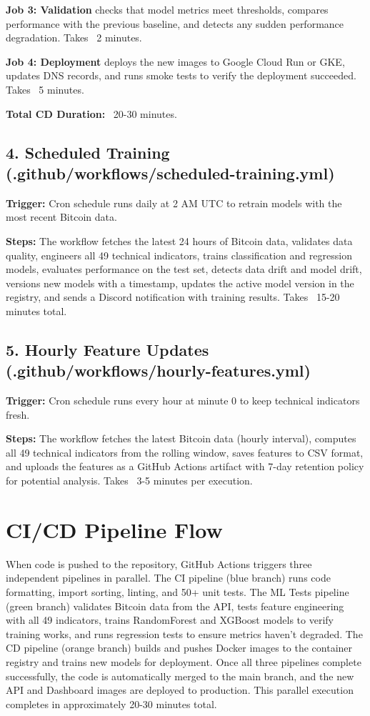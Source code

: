 \textbf{Job 3: Validation} checks that model metrics meet thresholds, compares performance with the previous baseline, and detects any sudden performance degradation. Takes ~2 minutes.

\textbf{Job 4: Deployment} deploys the new images to Google Cloud Run or GKE, updates DNS records, and runs smoke tests to verify the deployment succeeded. Takes ~5 minutes.

\textbf{Total CD Duration:} ~20-30 minutes.

\subsection{4. Scheduled Training (.github/workflows/scheduled-training.yml)}

\textbf{Trigger:} Cron schedule runs daily at 2 AM UTC to retrain models with the most recent Bitcoin data. 

\textbf{Steps:} The workflow fetches the latest 24 hours of Bitcoin data, validates data quality, engineers all 49 technical indicators, trains classification and regression models, evaluates performance on the test set, detects data drift and model drift, versions new models with a timestamp, updates the active model version in the registry, and sends a Discord notification with training results. Takes ~15-20 minutes total.

\subsection{5. Hourly Feature Updates (.github/workflows/hourly-features.yml)}

\textbf{Trigger:} Cron schedule runs every hour at minute 0 to keep technical indicators fresh.

\textbf{Steps:} The workflow fetches the latest Bitcoin data (hourly interval), computes all 49 technical indicators from the rolling window, saves features to CSV format, and uploads the features as a GitHub Actions artifact with 7-day retention policy for potential analysis. Takes ~3-5 minutes per execution.

\section{CI/CD Pipeline Flow}

When code is pushed to the repository, GitHub Actions triggers three independent pipelines in parallel. The CI pipeline (blue branch) runs code formatting, import sorting, linting, and 50+ unit tests. The ML Tests pipeline (green branch) validates Bitcoin data from the API, tests feature engineering with all 49 indicators, trains RandomForest and XGBoost models to verify training works, and runs regression tests to ensure metrics haven't degraded. The CD pipeline (orange branch) builds and pushes Docker images to the container registry and trains new models for deployment. Once all three pipelines complete successfully, the code is automatically merged to the main branch, and the new API and Dashboard images are deployed to production. This parallel execution completes in approximately 20-30 minutes total.


